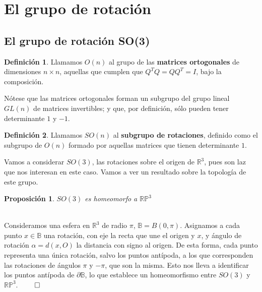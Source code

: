\documentclass{article}
\theoremstyle{plain}
\newtheorem{proposition}{Proposición}
\theoremstyle{definition}
\newtheorem{definition}{Definición}
\theoremstyle{remark}
\begin{document}
\maketitle

\newpage
\tableofcontents
\newpage

\section{El grupo de rotación}
\subsection{El grupo de rotación SO(3)}

\begin{definition}
  Llamamos $O(n)$ al grupo de las \textbf{matrices ortogonales}
  de dimensiones $n \times n$, aquellas que cumplen que $Q^TQ = QQ^T = I$,
  bajo la composición.
\end{definition}

Nótese que las matrices ortogonales forman un subgrupo del grupo
lineal $GL(n)$ de matrices invertibles; y que, por definición, sólo
pueden tener determinante $1$ y $-1$.

\begin{definition}
  Llamamos $SO(n)$ al \textbf{subgrupo de rotaciones}, definido como
  el subgrupo de $O(n)$ formado por aquellas matrices que tienen
  determinante $1$.
\end{definition}

Vamos a considerar $SO(3)$, las rotaciones sobre el origen de $\mathbb R^3$, pues son laz que nos interesan en este caso.
Vamos a ver un resultado sobre la topología de este grupo.

\begin{proposition}
	$SO(3)$ es homeomorfo a $\mathbb{RP}^3$
\end{proposition}

\begin{proofname}\\
	Consideramos una esfera en $\mathbb R^3$ de radio $\pi$, $\mathbb B = B(0, \pi)$. Asignamos a cada punto $x \in \mathbb B$
	una rotación, con eje la recta que une el origen y $x$, y ángulo de rotación $\alpha = d(x, O)$ la distancia con signo al
	origen. De esta forma, cada	punto representa una única rotación, salvo los puntos antípoda, a los que corresponden las
	rotaciones de ángulos $\pi$ y $-\pi$, que son la misma. Esto nos lleva a identificar los puntos antípoda de $\partial \mathbb B$,
	lo que establece un homeomorfismo entre $SO(3)$ y $\mathbb{RP}^3$. $\qed$
\end{proofname}
\end{document}
